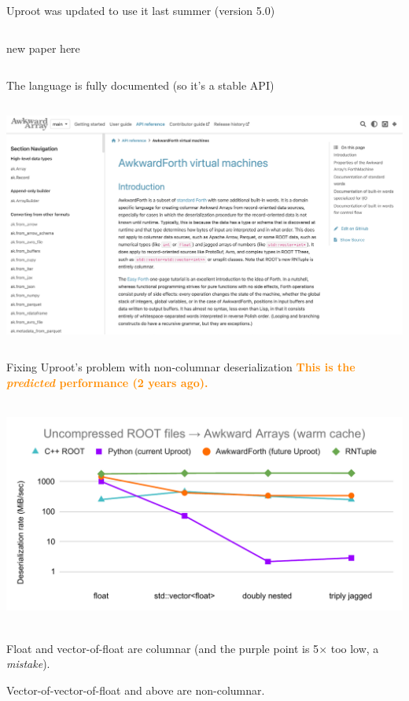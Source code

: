 \documentclass[aspectratio=169]{beamer}
\begin{document}
\begin{frame}{Uproot was updated to use it last summer (version 5.0)}
\vspace{0.17 cm}
\begin{columns}
new paper here
\end{columns}
\end{frame}

\begin{frame}{The language is fully documented (so it's a stable API)}
\vspace{0.17 cm}
\begin{columns}
\includegraphics[width=\linewidth]{PLOTS/AwkwardForth-documentation.png}
\end{columns}
\end{frame}

\begin{frame}{Fixing Uproot's problem with non-columnar deserialization}
\vspace{0.25 cm}
\textcolor{darkorange}{\bf \centering This is the {\it predicted} performance (2 years ago).}

\mbox{ } \hfill \includegraphics[width=0.9\linewidth]{PLOTS/AwkwardForth-performance-ROOT.pdf} \hfill \mbox{ }

Float and vector-of-float are columnar (and the purple point is 5$\times$ too low, a {\it mistake}).

Vector-of-vector-of-float and above are non-columnar.
\end{frame}
\end{document}

